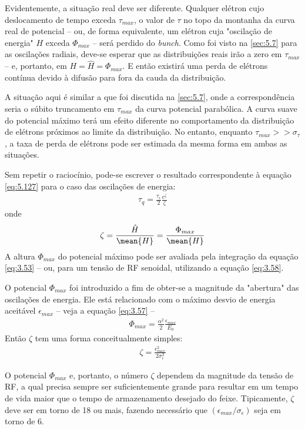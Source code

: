 Evidentemente, a situação real deve ser diferente. Qualquer elétron cujo deslocamento de tempo exceda $\tau_{max}$, o valor de $\tau$ no topo da montanha da curva real de potencial -- ou, de forma equivalente, um elétron cuja "oscilação de energia" $H$ exceda $\Phi_{max}$ -- será perdido do \textit{bunch}. Como foi visto na \autoref{sec:5.7} para as oscilações radiais, deve-se esperar que as distribuições reais irão a zero em $\tau_{max}$ -- e, portanto, em $H = \hat{H} = \Phi_{max}$. E então existirá uma perda de elétrons contínua devido à difusão para fora da cauda da distribuição.

A situação aqui é similar a que foi discutida na \autoref{sec:5.7}, onde a correspondência seria o súbito truncamento em $\tau_{max}$ da curva potencial parabólica. A curva suave do potencial máximo terá um efeito diferente no comportamento da distribuição de elétrons próximos ao limite da distribuição. No entanto, enquanto $\tau_{max} >> \sigma_\tau$, a taxa de perda de elétrons pode ser estimada da mesma forma em ambas as situações.

Sem repetir o raciocínio, pode-se escrever o resultado correspondente à equação \eqref{eq:5.127} para o caso das oscilações de energia:
\begin{align}
	\tau_q = \frac{\tau_\epsilon}{2}\frac{e^{\zeta}}{\zeta}
\end{align}
onde
\begin{align}
	\zeta = \frac{\hat{H}}{\mean{H}} = \frac{\Phi_{max}}{\mean{H}}
\end{align}
A altura $\Phi_{max}$ do potencial máximo pode ser avaliada pela integração da equação \eqref{eq:3.53} -- ou, para um tensão de RF senoidal, utilizando a equação \eqref{eq:3.58}.

O potencial $\Phi_{max}$ foi introduzido a fim de obter-se a magnitude da "abertura" das oscilações de energia. Ele está relacionado com o máximo desvio de energia aceitável $\epsilon_{max}$ -- veja a equação \eqref{eq:3.57} --
\begin{align}
	\Phi_{max} = \frac{\alpha^2}{2}\frac{\epsilon_{max}}{E_0}
\end{align}
Então $\zeta$ tem uma forma conceitualmente simples:
\begin{align}
	\zeta = \frac{\epsilon_{max}^2}{2 \sigma_\epsilon^2}
\end{align}

O potencial $\Phi_{max}$ e, portanto, o número $\zeta$ dependem da magnitude da tensão de RF, a qual precisa sempre ser suficientemente grande para resultar em um tempo de vida maior que o tempo de armazenamento desejado do feixe. Tipicamente, $\zeta$ deve ser em torno de 18 ou mais, fazendo necessário que $(\epsilon_{max}/\sigma_\epsilon)$ seja em torno de 6.

